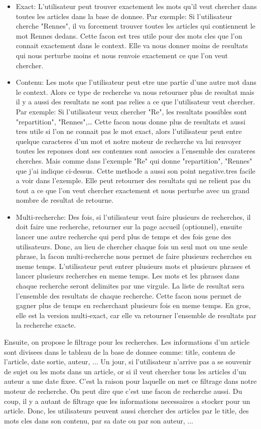 \begin{itemize}
\item Exact: L'utilisateur peut trouver exactement les mots qu'il veut chercher dans toutes les articles dans la base de donnee. Par exemple: Si l'utilisateur cherche "Rennes", il va forcement trouver toutes les articles qui contiennent le mot Rennes dedans. Cette facon est tres utile pour des mots cles que l’on connait exactement dans le context. Elle va nous donner moins de resultats qui nous perturbe moins et nous renvoie exactement ce que l’on veut chercher.
\item Contenu: Les mots que l'utilisateur peut etre une partie d'une autre mot dans le context. Alors ce type de recherche va nous retourner plus de resultat mais il y a aussi des resultats ne sont pas relies a ce que l'utilisateur veut chercher. Par exemple: Si l'utilisateur veux chercher "Re", les resultats possibles sont "repartition", "Rennes",… Cette facon nous donne plus de resultats et aussi tres utile si l’on ne connait pas le mot exact, alors l’utilisateur peut entre quelque caracteres d’un mot et notre moteur de recherche va lui renvoyer toutes les reponses dont ses contenues sont associes a l’ensemble des carateres cherches. Mais comme dans l’exemple "Re" qui donne "repartition", "Rennes" que j’ai indique ci-dessus. Cette methode a aussi son point negative.tres facile a voir dans l’exemple. Elle peut retourner des resultats qui ne relient pas du tout a ce que l’on veut chercher exactement et nous perturbe avec un grand nombre de resultat de retourne.
\item Multi-recherche: Des fois, si l’utilisateur veut faire plusieurs de recherches, il doit faire une recherche, retourner sur la page accueil (optionnel), ensuite lancer une autre recherche qui perd plus de temps et des fois gene des utilisateurs. Donc, au lieu de chercher chaque fois un seul mot ou une seule phrase, la facon multi-recherche nous permet de faire plusieurs recherches en meme temps. L’utilisateur peut entrer plusieurs mots et plusieurs phrases et lancer plusieurs recherches en meme temps. Les mots et les phrases dans chaque recherche seront delimites par une virgule. La liste de resultat sera l’ensemble des resultats de chaque recherche. Cette facon nous permet de gagner plus de temps en recherchant plusieurs fois en meme temps. En gros, elle est la version multi-exact, car elle va retourner l’ensemble de resultats par la recherche exacte.
\end{itemize}

	Ensuite, on propose le filtrage pour les recherches. Les informations d’un article sont divisees dans le tableau de la base de donnee comme: title, contenu de l’article, date sortie, auteur, ... Un jour, si l’utilisateur n’arrive pas a se souvenir de sujet ou les mots dans un article, or si il veut chercher tous les articles d’un auteur a une date fixee. C’est la raison pour laquelle on met ce filtrage dans notre moteur de recherche. On peut dire que c’est une facon de recherche aussi. Du coup, il y a autant de filtrage que les informations necessaires a stocker pour un article. Donc, les utilisateurs peuvent aussi chercher des articles par le title, des mots cles dans son contenu, par sa date ou par son auteur, ...
 
